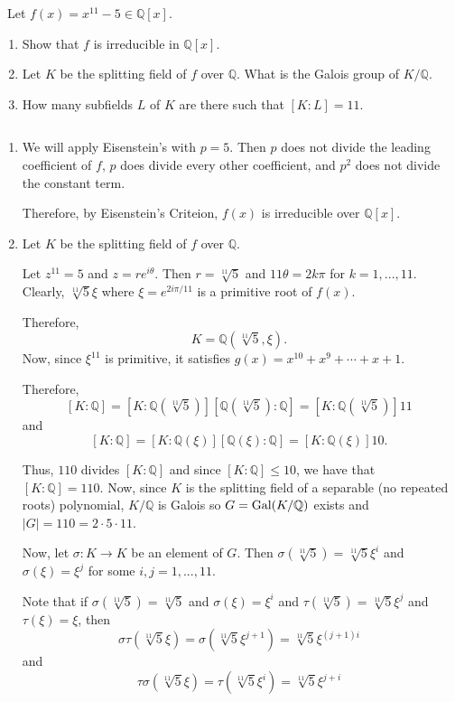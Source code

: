 \documentclass[12pt]{Qual}
\begin{document}
\begin{problem} $\,$
Let $f(x)=x^{11}-5\in\mathbb{Q}[x]$.
\begin{enumerate}[label=(\alph*)]
    \item Show that $f$ is irreducible in $\mathbb{Q}[x].$
    \item Let $K$ be the splitting field of $f$ over $\mathbb{Q}.$ What is the Galois group of $K/\mathbb{Q}$.
    \item How many subfields $L$ of $K$ are there such that $[K:L]=11$.
\end{enumerate}
\end{problem}


\begin{solution}$\,$
\begin{enumerate}[label=(\alph*)]
    \item We will apply Eisenstein's with $p=5$. Then $p$ does not divide the leading coefficient of $f$, $p$ does divide every other coefficient, and $p^2$ does not divide the constant term.

    Therefore, by Eisenstein's Criteion, $f(x)$ is irreducible over $\mathbb{Q}[x]$.
    \item Let $K$ be the splitting field of $f$ over $\mathbb{Q}.$

    Let $z^{11}=5$ and $z=re^{i\theta}$. Then $r=\sqrt[11]{5}$ and $11\theta=2k\pi$ for $k=1,...,11$. Clearly, $\sqrt[11]{5}\xi$ where $\xi=e^{2i\pi/11}$ is a primitive root of $f(x)$.

    Therefore, $$K=\mathbb{Q}(\sqrt[11]{5},\xi).$$ Now, since $\xi^{11}$ is primitive, it satisfies $g(x)=x^{10}+x^9+\cdots+x+1$.

    Therefore, $$[K:\mathbb{Q}]=[K:\mathbb{Q}(\sqrt[11]{5})][\mathbb{Q}(\sqrt[11]{5}):\mathbb{Q}]=[K:\mathbb{Q}(\sqrt[11]{5})]11$$ and $$[K:\mathbb{Q}]=[K:\mathbb{Q}(\xi)][\mathbb{Q}(\xi):\mathbb{Q}]=[K:\mathbb{Q}(\xi)]10.$$

    Thus, $110$ divides $[K:\mathbb{Q}]$ and since $[K:\mathbb{Q}]\le10$, we have that $[K:\mathbb{Q}]=110.$ Now, since $K$ is the splitting field of a separable (no repeated roots) polynomial, $K/\mathbb{Q}$ is Galois so $G=\text{Gal}(K/\mathbb{Q})$ exists and $|G|=110=2\cdot5\cdot11$.

    Now, let $\sigma:K\to K$ be an element of $G$. Then $\sigma(\sqrt[11]{5})=\sqrt[11]{5}\xi^i$ and $\sigma(\xi)=\xi^j$ for some $i,j=1,...,11$.

    Note that if $\sigma(\sqrt[11]{5})=\sqrt[11]{5}$ and $\sigma(\xi)=\xi^i$ and $\tau(\sqrt[11]{5})=\sqrt[11]{5}\xi^j$ and $\tau(\xi)=\xi$, then $$\sigma\tau(\sqrt[11]{5}\xi)=\sigma(\sqrt[11]{5}\xi^{j+1})=\sqrt[11]{5}\xi^{(j+1)i}$$ and $$\tau\sigma(\sqrt[11]{5}\xi)=\tau(\sqrt[11]{5}\xi^i)=\sqrt[11]{5}\xi^{j+i}$$


\end{enumerate}
\end{solution}
\end{document}
